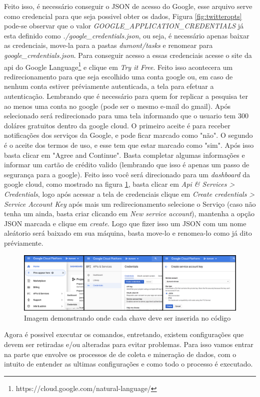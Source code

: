 Feito isso, é necessário conseguir o JSON de acesso do Google, esse arquivo serve como credencial para que seja possivel obter os dados, Figura \ref{fig:twitteropts} pode-se observar que o valor \textit{GOOGLE_APPLICATION_CREDENTIALS} já esta definido como \textit{./google_credentials.json}, ou seja, é necessário apenas baixar as credenciais, move-la para a pastas \textit{dumont/tasks} e renomear para \textit{google_credentials.json}. Para conseguir acesso a essas credenciais acesse o site da api do Google Language\footnote{https://cloud.google.com/natural-language/} e clique em \textit{Try it Free}. Feito isso acontecera um redirecionamento para que seja escolhido uma conta google ou, em caso de nenhum conta estiver préviamente autenticada, a tela para efetuar a autenticação. Lembrando que é necessário para quem for replicar a pesquisa ter ao menos uma conta no google (pode ser o mesmo e-mail do gmail). Após selecionado será redirecionado para uma tela informando que o usuario tem 300 doláres gratuitos dentro da google cloud. O primeiro aceite é para receber notificações dos serviços da Google, e pode ficar marcado como "não". O segundo é o aceite dos termos de uso, e esse tem que estar marcado como "sim". Após isso basta clicar em "Agree and Continue". Basta completar algumas informações e informar um cartão de crédito valido (lembrando que isso é apenas um passo de segurança para a google). Feito isso você será direcionado para um \textit{dashboard} da google cloud, como mostrado na figura \ref{fig:googleflow}, basta clicar em \textit{Api & Services > Credentials}, logo após acessar a tela de credenciais clique em \textit{Create credentials > Service Account Key} após mais um redirecionamento selecione o Serviço (caso não tenha um ainda, basta criar clicando em \textit{New service account}), mantenha a opção JSON marcada e clique em \textit{create}. Logo que fizer isso um JSON com um nome aleátorio será baixado em sua máquina, basta move-lo e renomea-lo como já dito préviamente.

\begin{figure}
    \centering
    \includegraphics[width=.8\textwidth]{imagens/googleflow.png}
    \caption{Imagem demonstrando onde cada chave deve ser inserida no código}
    \label{fig:googleflow}
\end{figure}

Agora é possivel executar os comandos, entretando, existem configurações que devem ser retiradas e/ou alteradas para evitar problemas. Para isso vamos entrar na parte que envolve os processos de de coleta e mineração de dados, com o intuito de entender as ultimas configurações e como todo o processo é executado.